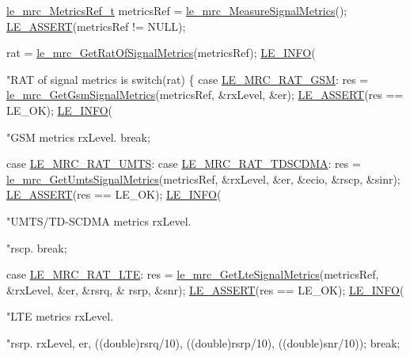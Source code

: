 \begin{DoxyCodeInclude}
    \hyperlink{le__mrc__interface_8h_a6ad5afb123492b2e249f3ecd414d6e83}{le\_mrc\_MetricsRef\_t} metricsRef = 
      \hyperlink{le__mrc__interface_8h_ad3662723a7ed47cf45d9a2eaaa1fb16e}{le\_mrc\_MeasureSignalMetrics}();
    \hyperlink{le__log_8h_ac0dbbef91dc0fed449d0092ff0557b39}{LE\_ASSERT}(metricsRef != NULL);

    rat = \hyperlink{le__mrc__interface_8h_a5564bace31c937bcef096e597f33d3a4}{le\_mrc\_GetRatOfSignalMetrics}(metricsRef);
    \hyperlink{le__log_8h_a23e6d206faa64f612045d688cdde5808}{LE\_INFO}(\textcolor{stringliteral}{"RAT of signal metrics is %
    \textcolor{keywordflow}{switch}(rat)
    \{
        \textcolor{keywordflow}{case} \hyperlink{le__mrc__interface_8h_aaf23906c37ad59fb96a8a48f7fab5b43ae19505d98b78ac22398bce06605dd1a4}{LE\_MRC\_RAT\_GSM}:
            res = \hyperlink{le__mrc__interface_8h_a9d7243b29bf4c705c4eba83fa3799582}{le\_mrc\_GetGsmSignalMetrics}(metricsRef, &rxLevel, &er);
            \hyperlink{le__log_8h_ac0dbbef91dc0fed449d0092ff0557b39}{LE\_ASSERT}(res == LE\_OK);
            \hyperlink{le__log_8h_a23e6d206faa64f612045d688cdde5808}{LE\_INFO}(\textcolor{stringliteral}{"GSM metrics rxLevel.%
            \textcolor{keywordflow}{break};

        \textcolor{keywordflow}{case} \hyperlink{le__mrc__interface_8h_aaf23906c37ad59fb96a8a48f7fab5b43afe34c4f3a53aa717f5ecb94dd59bf728}{LE\_MRC\_RAT\_UMTS}:
        \textcolor{keywordflow}{case} \hyperlink{le__mrc__interface_8h_aaf23906c37ad59fb96a8a48f7fab5b43a1b0c0f61b82d3619cc951c7c249ebbcf}{LE\_MRC\_RAT\_TDSCDMA}:
            res = \hyperlink{le__mrc__interface_8h_a456648564abfc8e9711b60a5d8bddc9b}{le\_mrc\_GetUmtsSignalMetrics}(metricsRef, &rxLevel, &er, &ecio, 
      &rscp, &sinr);
            \hyperlink{le__log_8h_ac0dbbef91dc0fed449d0092ff0557b39}{LE\_ASSERT}(res == LE\_OK);
            \hyperlink{le__log_8h_a23e6d206faa64f612045d688cdde5808}{LE\_INFO}(\textcolor{stringliteral}{"UMTS/TD-SCDMA metrics rxLevel.%
                    \textcolor{stringliteral}{"rscp.%
            \textcolor{keywordflow}{break};

        \textcolor{keywordflow}{case} \hyperlink{le__mrc__interface_8h_aaf23906c37ad59fb96a8a48f7fab5b43aaf2b25a8ec75f9bacb51967f23247176}{LE\_MRC\_RAT\_LTE}:
            res = \hyperlink{le__mrc__interface_8h_a030880c064afbf2686726fd2e538adfe}{le\_mrc\_GetLteSignalMetrics}(metricsRef, &rxLevel, &er, &rsrq, &
      rsrp, &snr);
            \hyperlink{le__log_8h_ac0dbbef91dc0fed449d0092ff0557b39}{LE\_ASSERT}(res == LE\_OK);
            \hyperlink{le__log_8h_a23e6d206faa64f612045d688cdde5808}{LE\_INFO}(\textcolor{stringliteral}{"LTE metrics rxLevel.%
                    \textcolor{stringliteral}{"rsrp.%
                    rxLevel, er, ((\textcolor{keywordtype}{double})rsrq/10), ((\textcolor{keywordtype}{double})rsrp/10), ((\textcolor{keywordtype}{double})snr/10));
            \textcolor{keywordflow}{break};

}}}}}}
\end{DoxyCodeInclude}
